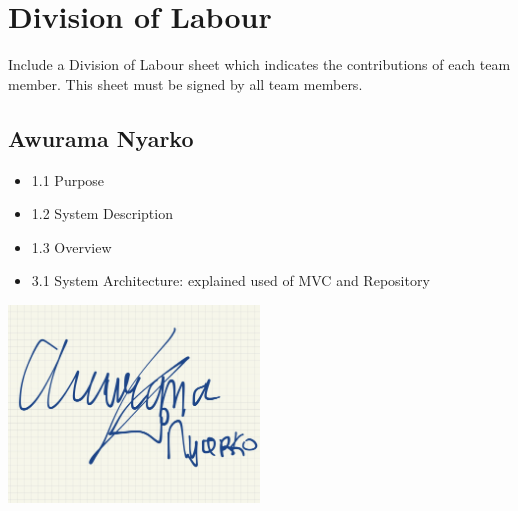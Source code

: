 \documentclass[]{article}
\begin{document}
\clearpage

\clearpage

\appendix
\section{Division of Labour}
\label{sec:division_of_labour}
Include a Division of Labour sheet which indicates the contributions of each team member. This sheet must be signed by all team members.
\subsection{Awurama Nyarko}
\label{subsec:awurama_nyarko}
\begin{itemize}
	\item 1.1 Purpose
	\item 1.2 System Description
	\item 1.3 Overview
	\item 3.1 System Architecture: explained used of MVC and Repository
\end{itemize}
\includegraphics[width=0.5\textwidth]{awurama.jpg}
\end{document}
